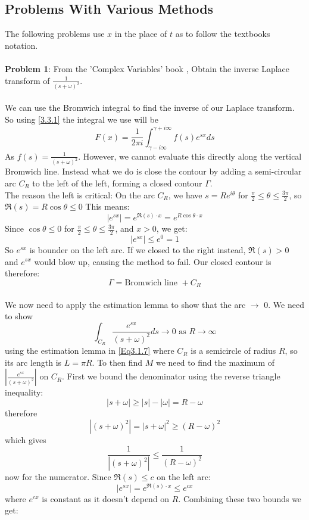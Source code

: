 \subsection{Problems With Various Methods}\label{4.1.6}
The following problems use $x$ in the place of $t$ as to follow the textbooks notation. 
\\
\\
\textbf{Problem 1}: From the 'Complex Variables' book \cite{RedBook}, Obtain the inverse Laplace transform of $\frac{1}{(s+\omega)^{2}}$. 
\\
\\
We can use the Bromwich integral to find the inverse of our Laplace transform. So using \ref{3.3.1} the integral we use will be 
\begin{equation}
    F(x)=\frac{1}{2\pi i}\int^{\gamma+i\infty}_{\gamma-i\infty}f(s)e^{sx}ds
\end{equation} 
As $f(s)=\frac{1}{(s+\omega)^{2}}$. However, we cannot evaluate this directly along the vertical Bromwich line. Instead what we do is close the contour by adding a semi-circular arc $C_{R}$ to the left of the left, forming a closed contour $\Gamma$. 
\\
The reason the left is critical: On the arc $C_{R}$, we have $s=Re^{i\theta}$ for $\frac{\pi}{2}\leq\theta\leq\frac{3\pi}{2}$, so $\Re(s)=R\cos\theta\leq0$ This means: $$|e^{sx}|=e^{\Re(s)\cdot x}=e^{R\cos\theta\cdot x}$$ Since $\cos\theta\leq0$ for $\frac{\pi}{2}\leq\theta\leq\frac{3\pi}{2}$, and $x>0$, we get: $$|e^{sx}|\leq e^{0}=1$$ So $e^{sx}$ is bounder on the left arc. If we closed to the right instead, $\Re(s)>0$ and $e^{sx}$ would blow up, causing the method to fail. Our closed contour is therefore: $$\Gamma=\text{Bromwich line }+C_{R}$$
\\
We now need to apply the estimation lemma to show that the arc $\rightarrow$ 0. We need to show 
\begin{equation}
    \int_{C_{R}}\frac{e^{sx}}{(s+\omega)^{2}}ds\rightarrow0 \text{ as } R\rightarrow\infty
\end{equation}
using the estimation lemma in \ref{Eq3.1.7} where $C_{R}$ is a semicircle of radius $R$, so its arc length is $L=\pi R$. To then find $M$ we need to find the maximum of $\left|\frac{e^{sx}}{(s+\omega)^{2}}\right|$ on $C_{R}$. First we bound the denominator using the reverse triangle inequality: $$|s+\omega|\geq|s|-|\omega|= R-\omega$$ therefore $$|(s+\omega)^{2}|=|s+\omega|^{2}\geq(R-\omega)^{2}$$ which gives $$\frac{1}{|(s+\omega)^{2}|}\leq\frac{1}{(R-\omega)^{2}}$$ now for the numerator. Since $\Re(s)\leq c$ on the left arc: $$|e^{sx}|=e^{\Re(s)\cdot x}\leq e^{cx}$$ where $e^{cx}$ is constant as it doesn't depend on $R$. Combining these two bounds we get: 
